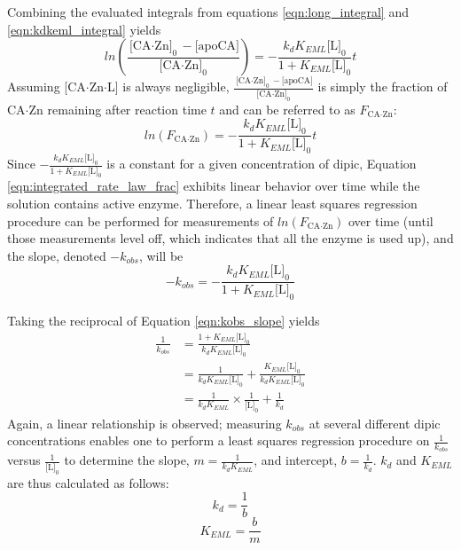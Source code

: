 Combining the evaluated integrals from equations \eqref{eqn:long_integral} and \eqref{eqn:kdkeml_integral} yields
\begin{equation}\label{eqn:integrated_rate_law}
ln \left( \frac{\text{[CA$\cdot$Zn]}_0 - \text{[apoCA]}}{\text{[CA$\cdot$Zn]}_0} \right)
=
-\frac{k_{d}K_{EML}\text{[L]}_0}{1+K_{EML}\text{[L]}_0}t
\end{equation}
Assuming [CA$\cdot$Zn$\cdot$L] is always negligible, $\frac{\text{[CA$\cdot$Zn]}_0 - \text{[apoCA]}}{\text{[CA$\cdot$Zn]}_0}$ is simply the fraction of CA$\cdot$Zn remaining after reaction time $t$ and can be referred to as $F_\text{CA$\cdot$Zn}$:
\begin{equation}\label{eqn:integrated_rate_law_frac}
ln \left( F_\text{CA$\cdot$Zn} \right)
=
-\frac{k_{d}K_{EML}\text{[L]}_0}{1+K_{EML}\text{[L]}_0}t
\end{equation}
Since $-\frac{k_{d}K_{EML}\text{[L]}_0}{1+K_{EML}\text{[L]}_0}$ is a constant for a given concentration of dipic, Equation \eqref{eqn:integrated_rate_law_frac} exhibits linear behavior over time while the solution contains active enzyme. Therefore, a linear least squares regression procedure can be performed for measurements of $ln \left( F_\text{CA$\cdot$Zn} \right)$ over time (until those measurements level off, which indicates that all the enzyme is used up), and the slope, denoted $-k_{obs}$, will be
\begin{equation}\label{eqn:kobs_slope}
-k_{obs}
=
-\frac{k_{d}K_{EML}\text{[L]}_0}{1+K_{EML}\text{[L]}_0}
\end{equation}

Taking the reciprocal of Equation \eqref{eqn:kobs_slope} yields
\begin{equation}\label{eqn:kobs_slope_reciprocal}
\begin{split}
\frac{1}{k_{obs}}
&=
\frac{1+K_{EML}\text{[L]}_0}{k_{d}K_{EML}\text{[L]}_0} \\
&= \frac{1}{k_{d}K_{EML}\text{[L]}_0} + \frac{K_{EML}\text{[L]}_0}{k_{d}K_{EML}\text{[L]}_0} \\
&= \frac{1}{k_{d}K_{EML}} \times \frac{1}{\text{[L]}_0} + \frac{1}{k_{d}}
\end{split}
\end{equation}
Again, a linear relationship is observed; measuring $k_{obs}$ at several different dipic concentrations enables one to perform a least squares regression procedure on $\frac{1}{k_{obs}}$ versus $\frac{1}{\text{[L]}_0}$ to determine the slope, $m=\frac{1}{k_{d}K_{EML}}$, and intercept, $b=\frac{1}{k_{d}}$. $k_d$ and $K_{EML}$ are thus calculated as follows:
\begin{equation}\label{eqn:calculating_kd}
k_d=\frac{1}{b}
\end{equation}
\begin{equation}\label{eqn:calculating_keml}
K_{EML}=\frac{b}{m}
\end{equation}

